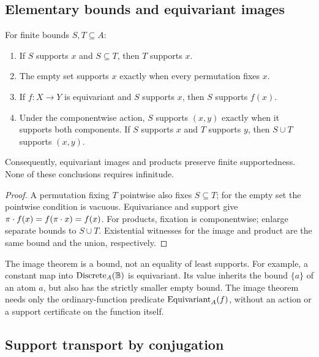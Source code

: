 \subsection{Elementary bounds and equivariant images}
\label{sec:finite-support-basic}
\label{sec:finite-support-products}

\begin{proposition}
\label{prop:support-basic}
\label{prop:support-products}
\label{prop:finitely-supported-basic}
For finite bounds $S,T\subseteq A$:
\begin{enumerate}
\item If $S$ supports $x$ and $S\subseteq T$, then $T$ supports $x$.
\item The empty set supports $x$ exactly when every permutation fixes $x$.
\item If $f:X\to Y$ is equivariant and $S$ supports $x$, then $S$ supports
  $f(x)$.
\item Under the componentwise action, $S$ supports $(x,y)$ exactly when it
  supports both components. If $S$ supports $x$ and $T$ supports $y$,
  then $S\cup T$ supports $(x,y)$.
\end{enumerate}
Consequently, equivariant images and products preserve finite supportedness.
None of these conclusions requires infinitude.
\end{proposition}

\begin{proof}
A permutation fixing $T$ pointwise also fixes $S\subseteq T$; for the
empty set the pointwise condition is vacuous. Equivariance and support give
$\pi\mathbin{\cdot} f(x)=f(\pi\mathbin{\cdot} x)=f(x)$.
For products, fixation is componentwise; enlarge separate bounds to
$S\cup T$. Existential witnesses for the image and product are the same
bound and the union, respectively.
\end{proof}

The image theorem is a bound, not an equality of least supports. For
example, a constant map into $\operatorname{Discrete}_A(\mathbb B)$ is equivariant.
Its value inherits the bound $\{a\}$ of an atom $a$, but also has the
strictly smaller empty bound. The image theorem needs only the
ordinary-function predicate $\operatorname{Equivariant}_A(f)$, without an action or a
support certificate on the function itself.

\subsection{Support transport by conjugation}
\label{sec:support-transport}

